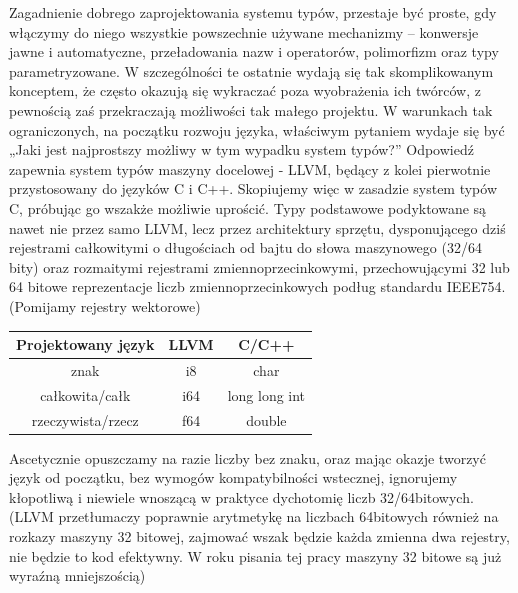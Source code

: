 


Zagadnienie dobrego zaprojektowania systemu typów, przestaje być proste, gdy włączymy do niego wszystkie powszechnie używane mechanizmy – konwersje jawne i automatyczne, przeładowania nazw i operatorów, polimorfizm oraz typy parametryzowane. W szczególności te ostatnie wydają się tak skomplikowanym konceptem, że często okazują się wykraczać poza wyobrażenia ich twórców\cite{cpp_templates_turing_complete}\cite{taming_wildcards_java}, z pewnością zaś przekraczają możliwości tak małego projektu.
W warunkach tak ograniczonych, na początku rozwoju języka, właściwym pytaniem wydaje się być „Jaki jest najprostszy możliwy w tym wypadku system typów?” Odpowiedź zapewnia system typów maszyny docelowej - LLVM, będący z kolei pierwotnie przystosowany do języków C i C++. Skopiujemy więc w zasadzie system typów C, próbując go wszakże możliwie uprościć.
Typy podstawowe podyktowane są nawet nie przez samo LLVM, lecz przez architektury sprzętu, dysponującego dziś rejestrami całkowitymi o długościach od bajtu do słowa maszynowego (32/64 bity) oraz rozmaitymi rejestrami zmiennoprzecinkowymi, przechowującymi 32 lub 64 bitowe  reprezentacje liczb zmiennoprzecinkowych podług standardu IEEE754. (Pomijamy rejestry wektorowe)
\begin{center}
\begin{tabular}{|c|c|c|}
\hline
\textbf{Projektowany język} & \textbf{LLVM} & \textbf{C/C++} \\ \hline
znak                        & i8       & char               \\ \hline
całkowita/całk              & i64      & long long int      \\ \hline
rzeczywista/rzecz           & f64      & double             \\ \hline
\end{tabular}
\end{center}

Ascetycznie opuszczamy na razie liczby bez znaku, oraz mając okazje tworzyć język od początku, bez wymogów kompatybilności wstecznej, ignorujemy kłopotliwą i niewiele wnoszącą w praktyce dychotomię liczb 32/64bitowych. (LLVM przetłumaczy poprawnie arytmetykę na liczbach 64bitowych również na rozkazy maszyny 32 bitowej, zajmować wszak będzie każda zmienna dwa rejestry, nie będzie to kod efektywny. W roku pisania tej pracy maszyny 32 bitowe są już wyraźną mniejszością)

